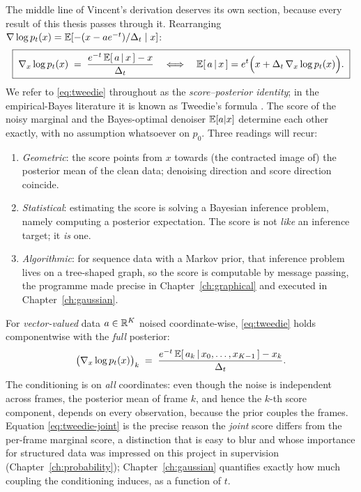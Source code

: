 The middle line of Vincent's derivation deserves its own section,
because every result of this thesis passes through it. Rearranging
$\nabla \log p_t(x) = \mathbb{E}[-(x - a e^{-t})/\Delta_t \mid x]$:
\begin{equation}
  \boxed{\;
  \nabla_x \log p_t(x)
  \;=\; \frac{e^{-t}\,\mathbb{E}[\,a \,|\, x\,] - x}{\Delta_t}
  \quad\Longleftrightarrow\quad
  \mathbb{E}[\,a \,|\, x\,]
  = e^{t} \Big( x + \Delta_t\, \nabla_x \log p_t(x) \Big).
  \;}
  \label{eq:tweedie}
\end{equation}
We refer to \eqref{eq:tweedie} throughout as the \emph{score--posterior
identity}; in the empirical-Bayes literature it is known as Tweedie's
formula \citep{robbins1956empirical, miyasawa1961empirical,
efron2011tweedie}. The score of the noisy marginal and the Bayes-optimal
denoiser $\mathbb{E}[a|x]$ determine each other exactly, with no assumption
whatsoever on $p_0$. Three readings will recur:
\begin{enumerate}
  \item \emph{Geometric}: the score points from $x$ towards (the
  contracted image of) the posterior mean of the clean data; denoising
  direction and score direction coincide.
  \item \emph{Statistical}: estimating the score is solving a Bayesian
  inference problem, namely computing a posterior expectation. The score
  is not \emph{like} an inference target; it \emph{is} one.
  \item \emph{Algorithmic}: for sequence data with a Markov prior, that
  inference problem lives on a tree-shaped graph, so the score is
  computable by message passing, the programme made precise in
  Chapter~\ref{ch:graphical} and executed in Chapter~\ref{ch:gaussian}.
\end{enumerate}

For \emph{vector-valued} data $a \in \mathbb{R}^K$ noised coordinate-wise,
\eqref{eq:tweedie} holds componentwise with the \emph{full} posterior:
\begin{equation}
  \big( \nabla_x \log p_t(x) \big)_k
  \;=\; \frac{e^{-t}\, \mathbb{E}[\,a_k \,|\, x_0, \dots, x_{K-1}\,] - x_k}{\Delta_t}.
  \label{eq:tweedie-joint}
\end{equation}
The conditioning is on \emph{all} coordinates: even though the noise is
independent across frames, the posterior mean of frame $k$, and hence the
$k$-th score component, depends on every observation, because the prior
couples the frames. Equation \eqref{eq:tweedie-joint} is the precise
reason the \emph{joint} score differs from the per-frame marginal score,
a distinction that is easy to blur and whose importance for structured
data was impressed on this project in supervision
(Chapter~\ref{ch:probability}); Chapter~\ref{ch:gaussian} quantifies
exactly how much coupling the conditioning induces, as a function of $t$.

